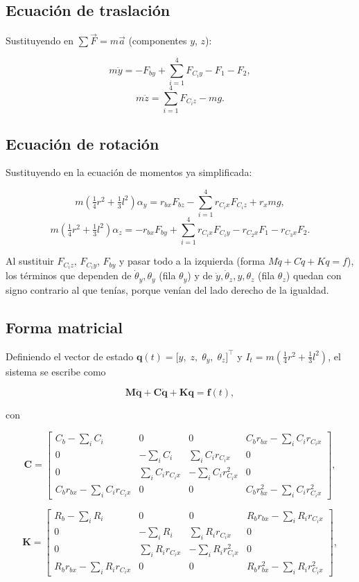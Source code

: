 \subsection{Ecuación de traslación}

Sustituyendo en $\sum\vec F=m\vec a$ (componentes $y$, $z$):

\[
m\ddot y=-F_{by}+\sum_{i=1}^4 F_{C_iy}-F_1-F_2,
\]
\[
m\ddot z=\sum_{i=1}^4 F_{C_iz}-mg.
\]

\subsection{Ecuación de rotación}

Sustituyendo en la ecuación de momentos ya simplificada:

\[
m\left(\tfrac14 r^2+\tfrac13 l^2\right)\alpha_y
=r_{bx}F_{bz}-\sum_{i=1}^4 r_{C_ix}F_{C_iz}+r_xmg,
\]
\[
m\left(\tfrac14 r^2+\tfrac13 l^2\right)\alpha_z
=-r_{bx}F_{by}+\sum_{i=1}^4 r_{C_ix}F_{C_iy}-r_{C_2x}F_1-r_{C_3x}F_2.
\]

Al sustituir $F_{C_iz}$, $F_{C_iy}$, $F_{by}$ y pasar todo a la izquierda (forma $M\ddot q+C\dot q+Kq=f$), los términos que dependen de $\dot\theta_y,\theta_y$ (fila $\theta_y$) y de $\dot y,\dot\theta_z,y,\theta_z$ (fila $\theta_z$) quedan con signo contrario al que tenías, porque venían del lado derecho de la igualdad.


\subsection{Forma matricial}

Definiendo el vector de estado $\mathbf q(t)=\big[y,\;z,\;\theta_y,\;\theta_z\big]^\top$ y $I_t=m\left(\tfrac14 r^2+\tfrac13 l^2\right)$, el sistema se escribe como

\[
\mathbf M\ddot{\mathbf q}+\mathbf C\dot{\mathbf q}+\mathbf K\mathbf q=\mathbf f(t),
\]

con

\[
\mathbf C=\begin{bmatrix}
C_b-\sum_i C_i & 0 & 0 & C_b r_{bx}-\sum_i C_i r_{C_ix}\\[2pt]
0 & -\sum_i C_i & \sum_i C_i r_{C_ix} & 0\\[2pt]
0 & \sum_i C_i r_{C_ix} & -\sum_i C_i r_{C_ix}^2 & 0\\[2pt]
C_b r_{bx}-\sum_i C_i r_{C_ix} & 0 & 0 & C_br_{bx}^2-\sum_i C_i r_{C_ix}^2
\end{bmatrix},
\]

\[
\mathbf K=\begin{bmatrix}
R_b-\sum_i R_i & 0 & 0 & R_b r_{bx}-\sum_i R_i r_{C_ix}\\[2pt]
0 & -\sum_i R_i & \sum_i R_i r_{C_ix} & 0\\[2pt]
0 & \sum_i R_i r_{C_ix} & -\sum_i R_i r_{C_ix}^2 & 0\\[2pt]
R_b r_{bx}-\sum_i R_i r_{C_ix} & 0 & 0 & R_br_{bx}^2-\sum_i R_i r_{C_ix}^2
\end{bmatrix},
\]

